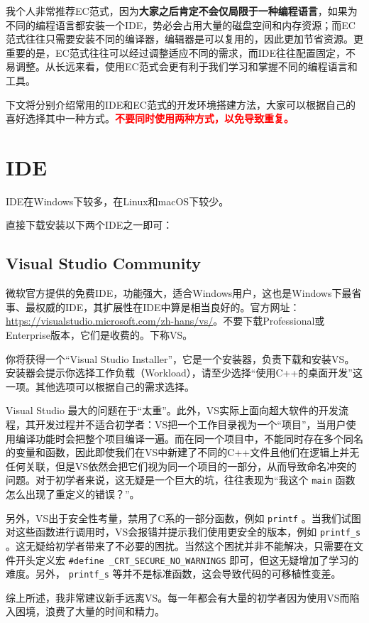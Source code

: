 我个人非常推荐EC范式，因为\textbf{大家之后肯定不会仅局限于一种编程语言}，如果为不同的编程语言都安装一个IDE，势必会占用大量的磁盘空间和内存资源；而EC范式往往只需要安装不同的编译器，编辑器是可以复用的，因此更加节省资源。更重要的是，EC范式往往可以经过调整适应不同的需求，而IDE往往配置固定，不易调整。从长远来看，使用EC范式会更有利于我们学习和掌握不同的编程语言和工具。

下文将分别介绍常用的IDE和EC范式的开发环境搭建方法，大家可以根据自己的喜好选择其中一种方式。\textcolor{red}{\bfseries 不要同时使用两种方式，以免导致重复。}

\section{IDE}

IDE在Windows下较多，在Linux和macOS下较少。

直接下载安装以下两个IDE之一即可：

\subsection{Visual Studio Community}
微软官方提供的免费IDE，功能强大，适合Windows用户，这也是Windows下最省事、最权威的IDE，其扩展性在IDE中算是相当良好的。官方网址：\url{https://visualstudio.microsoft.com/zh-hans/vs/}。不要下载Professional或Enterprise版本，它们是收费的。下称VS。

你将获得一个“Visual Studio Installer”，它是一个安装器，负责下载和安装VS。安装器会提示你选择工作负载（Workload），请至少选择“使用C++的桌面开发”这一项。其他选项可以根据自己的需求选择。

\begin{remark}{}
    Visual Studio 最大的问题在于“太重”。此外，VS实际上面向超大软件的开发流程，其开发过程并不适合初学者：VS把一个工作目录视为一个“项目”，当用户使用编译功能时会把整个项目编译一遍。而在同一个项目中，不能同时存在多个同名的变量和函数，因此即使我们在VS中新建了不同的C++文件且他们在逻辑上并无任何关联，但是VS依然会把它们视为同一个项目的一部分，从而导致命名冲突的问题。对于初学者来说，这无疑是一个巨大的坑，往往表现为“我这个 \texttt{main} 函数怎么出现了重定义的错误？”。

    另外，VS出于安全性考量，禁用了C系的一部分函数，例如 \texttt{printf} 。当我们试图对这些函数进行调用时，VS会报错并提示我们使用更安全的版本，例如 \texttt{printf_s} 。这无疑给初学者带来了不必要的困扰。当然这个困扰并非不能解决，只需要在文件开头定义宏 \texttt{#define _CRT_SECURE_NO_WARNINGS} 即可，但这无疑增加了学习的难度。另外， \texttt{printf_s} 等并不是标准函数，这会导致代码的可移植性变差。

    综上所述，我非常建议新手远离VS。每一年都会有大量的初学者因为使用VS而陷入困境，浪费了大量的时间和精力。
\end{remark}

